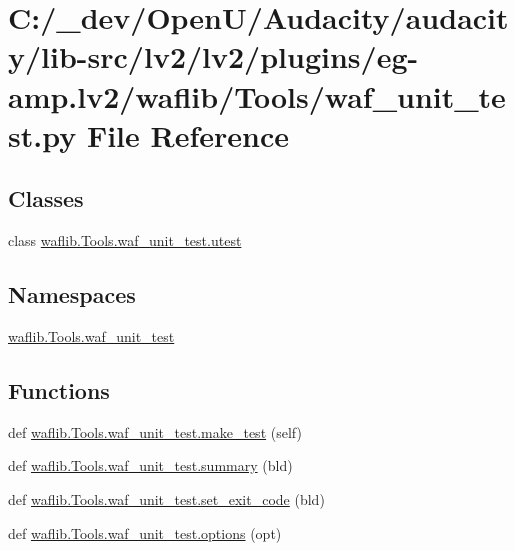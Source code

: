 \hypertarget{lv2_2plugins_2eg-amp_8lv2_2waflib_2_tools_2waf__unit__test_8py}{}\section{C\+:/\+\_\+dev/\+Open\+U/\+Audacity/audacity/lib-\/src/lv2/lv2/plugins/eg-\/amp.lv2/waflib/\+Tools/waf\+\_\+unit\+\_\+test.py File Reference}
\label{lv2_2plugins_2eg-amp_8lv2_2waflib_2_tools_2waf__unit__test_8py}
\subsection*{Classes}
\begin{DoxyCompactItemize}
\item 
class \hyperlink{classwaflib_1_1_tools_1_1waf__unit__test_1_1utest}{waflib.\+Tools.\+waf\+\_\+unit\+\_\+test.\+utest}
\end{DoxyCompactItemize}
\subsection*{Namespaces}
\begin{DoxyCompactItemize}
\item 
 \hyperlink{namespacewaflib_1_1_tools_1_1waf__unit__test}{waflib.\+Tools.\+waf\+\_\+unit\+\_\+test}
\end{DoxyCompactItemize}
\subsection*{Functions}
\begin{DoxyCompactItemize}
\item 
def \hyperlink{namespacewaflib_1_1_tools_1_1waf__unit__test_a480792e43cdb6d6a2bd79b2ec412cf00}{waflib.\+Tools.\+waf\+\_\+unit\+\_\+test.\+make\+\_\+test} (self)
\item 
def \hyperlink{namespacewaflib_1_1_tools_1_1waf__unit__test_ad245dac5d636a5c5f49cb0e232d332f4}{waflib.\+Tools.\+waf\+\_\+unit\+\_\+test.\+summary} (bld)
\item 
def \hyperlink{namespacewaflib_1_1_tools_1_1waf__unit__test_a0f1dc47e6fcefddfd017ce557eb4da42}{waflib.\+Tools.\+waf\+\_\+unit\+\_\+test.\+set\+\_\+exit\+\_\+code} (bld)
\item 
def \hyperlink{namespacewaflib_1_1_tools_1_1waf__unit__test_a8f30080b41250ee5ad33b2ad2df40f0c}{waflib.\+Tools.\+waf\+\_\+unit\+\_\+test.\+options} (opt)
\end{DoxyCompactItemize}
